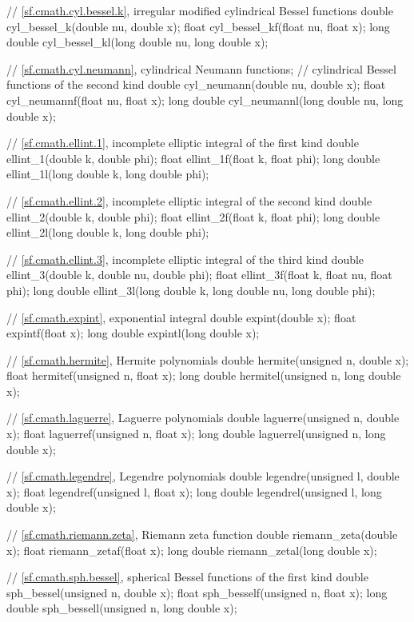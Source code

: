 \begin{codeblock}
{  // \ref{sf.cmath.cyl.bessel.k}, irregular modified cylindrical Bessel functions
  double       cyl_bessel_k(double nu, double x);
  float        cyl_bessel_kf(float nu, float x);
  long double  cyl_bessel_kl(long double nu, long double x);

  // \ref{sf.cmath.cyl.neumann}, cylindrical Neumann functions;
  // cylindrical Bessel functions of the second kind
  double       cyl_neumann(double nu, double x);
  float        cyl_neumannf(float nu, float x);
  long double  cyl_neumannl(long double nu, long double x);

  // \ref{sf.cmath.ellint.1}, incomplete elliptic integral of the first kind
  double       ellint_1(double k, double phi);
  float        ellint_1f(float k, float phi);
  long double  ellint_1l(long double k, long double phi);

  // \ref{sf.cmath.ellint.2}, incomplete elliptic integral of the second kind
  double       ellint_2(double k, double phi);
  float        ellint_2f(float k, float phi);
  long double  ellint_2l(long double k, long double phi);

  // \ref{sf.cmath.ellint.3}, incomplete elliptic integral of the third kind
  double       ellint_3(double k, double nu, double phi);
  float        ellint_3f(float k, float nu, float phi);
  long double  ellint_3l(long double k, long double nu, long double phi);

  // \ref{sf.cmath.expint}, exponential integral
  double       expint(double x);
  float        expintf(float x);
  long double  expintl(long double x);

  // \ref{sf.cmath.hermite}, Hermite polynomials
  double       hermite(unsigned n, double x);
  float        hermitef(unsigned n, float x);
  long double  hermitel(unsigned n, long double x);

  // \ref{sf.cmath.laguerre}, Laguerre polynomials
  double       laguerre(unsigned n, double x);
  float        laguerref(unsigned n, float x);
  long double  laguerrel(unsigned n, long double x);

  // \ref{sf.cmath.legendre}, Legendre polynomials
  double       legendre(unsigned l, double x);
  float        legendref(unsigned l, float x);
  long double  legendrel(unsigned l, long double x);

  // \ref{sf.cmath.riemann.zeta}, Riemann zeta function
  double       riemann_zeta(double x);
  float        riemann_zetaf(float x);
  long double  riemann_zetal(long double x);

  // \ref{sf.cmath.sph.bessel}, spherical Bessel functions of the first kind
  double       sph_bessel(unsigned n, double x);
  float        sph_besself(unsigned n, float x);
  long double  sph_bessell(unsigned n, long double x);

}
\end{codeblock}
